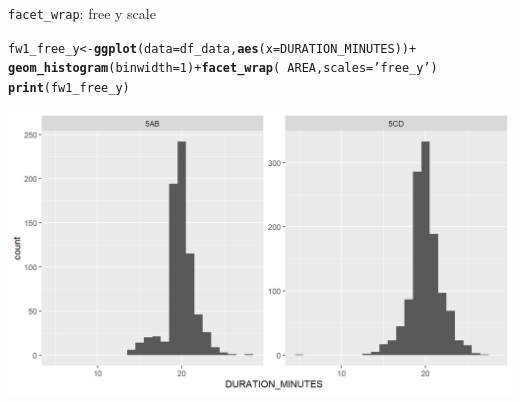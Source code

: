 \documentclass{beamer}\usepackage[]{graphicx}\usepackage[]{color}
\makeatletter
\newcommand{\hlnum}[1]{\textcolor[rgb]{0.686,0.059,0.569}{#1}}%
\newcommand{\hlstr}[1]{\textcolor[rgb]{0.192,0.494,0.8}{#1}}%
\newcommand{\hlopt}[1]{\textcolor[rgb]{0,0,0}{#1}}%
\newcommand{\hlstd}[1]{\textcolor[rgb]{0.345,0.345,0.345}{#1}}%
\newcommand{\hlkwb}[1]{\textcolor[rgb]{0.69,0.353,0.396}{#1}}%
\newcommand{\hlkwc}[1]{\textcolor[rgb]{0.333,0.667,0.333}{#1}}%
\newcommand{\hlkwd}[1]{\textcolor[rgb]{0.737,0.353,0.396}{\textbf{#1}}}%
\newenvironment{kframe}{%
 \def\at@end@of@kframe{}%
 \ifinner\ifhmode%
  \def\at@end@of@kframe{\end{minipage}}%
  \begin{minipage}{\columnwidth}%
 \fi\fi%
 \def\FrameCommand##1{\hskip\@totalleftmargin \hskip-\fboxsep
 \colorbox{shadecolor}{##1}\hskip-\fboxsep
     \hskip-\linewidth \hskip-\@totalleftmargin \hskip\columnwidth}%
 \MakeFramed {\advance\hsize-\width
   \@totalleftmargin\z@ \linewidth\hsize
   \@setminipage}}%
 {\par\unskip\endMakeFramed%
 \at@end@of@kframe}
\newenvironment{knitrout}{}{} %
\makeatother
\begin{document}
\begin{frame}[fragile]{\lstinline{facet_wrap}: free y scale}
\begin{knitrout}\footnotesize
{}\color{fgcolor}\begin{kframe}
\begin{alltt}
\hlstd{fw1_free_y} \hlkwb{<-} \hlkwd{ggplot}\hlstd{(}\hlkwc{data}\hlstd{=df_data,} \hlkwd{aes}\hlstd{(}\hlkwc{x}\hlstd{=DURATION_MINUTES))} \hlopt{+}
  \hlkwd{geom_histogram}\hlstd{(}\hlkwc{binwidth}\hlstd{=}\hlnum{1}\hlstd{)} \hlopt{+} \hlkwd{facet_wrap}\hlstd{(}\hlopt{~} \hlstd{AREA ,} \hlkwc{scales} \hlstd{=} \hlstr{'free_y'}\hlstd{)}
\hlkwd{print}\hlstd{(fw1_free_y)}
\end{alltt}
\end{kframe}

{\centering \includegraphics[width=.9\linewidth]{figure/facet_wrap_3-1} 

}



\end{knitrout}
\end{frame}
\end{document}
